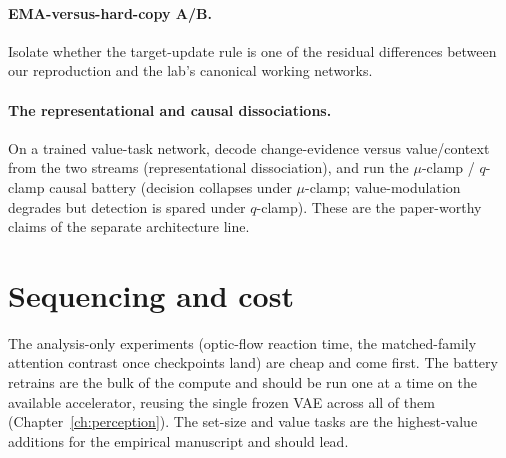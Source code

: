 \paragraph{EMA-versus-hard-copy A/B.} Isolate whether the target-update rule is one of the
residual differences between our reproduction and the lab's canonical working networks.

\paragraph{The representational and causal dissociations.} On a trained value-task network,
decode change-evidence versus value/context from the two streams (representational
dissociation), and run the $\mu$-clamp / $q$-clamp causal battery (decision collapses under
$\mu$-clamp; value-modulation degrades but detection is spared under $q$-clamp). These are
the paper-worthy claims of the separate architecture line.

\section{Sequencing and cost}
The analysis-only experiments (optic-flow reaction time, the matched-family attention
contrast once checkpoints land) are cheap and come first. The battery retrains are the bulk
of the compute and should be run one at a time on the available accelerator, reusing the
single frozen VAE across all of them (Chapter~\ref{ch:perception}). The set-size and value
tasks are the highest-value additions for the empirical manuscript and should lead.
